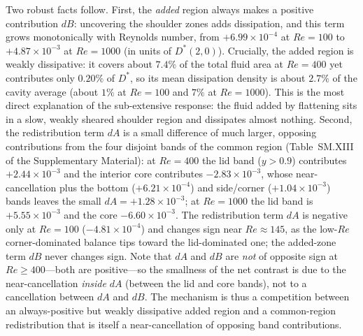 Two robust facts follow. First, the \emph{added} region always makes a positive contribution $dB$: uncovering the shoulder zones adds dissipation, and this term grows monotonically with Reynolds number, from $+6.99\times10^{-4}$ at $Re=100$ to $+4.87\times10^{-3}$ at $Re=1000$ (in units of $D^*(2,0)$). Crucially, the added region is weakly dissipative: it covers about $7.4\%$ of the total fluid area at $Re=400$ yet contributes only $0.20\%$ of $D^*$, so its mean dissipation density is about $2.7\%$ of the cavity average (about $1\%$ at $Re=100$ and $7\%$ at $Re=1000$). This is the most direct explanation of the sub-extensive response: the fluid added by flattening sits in a slow, weakly sheared shoulder region and dissipates almost nothing. Second, the redistribution term $dA$ is a small difference of much larger, opposing contributions from the four disjoint bands of the common region (Table~SM.XIII of the Supplementary Material): at $Re=400$ the lid band ($y>0.9$) contributes $+2.44\times10^{-3}$ and the interior core contributes $-2.83\times10^{-3}$, whose near-cancellation plus the bottom ($+6.21\times10^{-4}$) and side/corner ($+1.04\times10^{-3}$) bands leaves the small $dA=+1.28\times10^{-3}$; at $Re=1000$ the lid band is $+5.55\times10^{-3}$ and the core $-6.60\times10^{-3}$. The redistribution term $dA$ is negative only at $Re=100$ ($-4.81\times10^{-4}$) and changes sign near $Re\approx145$, as the low-$Re$ corner-dominated balance tips toward the lid-dominated one; the added-zone term $dB$ never changes sign. Note that $dA$ and $dB$ are \emph{not} of opposite sign at $Re\ge400$---both are positive---so the smallness of the net contrast is due to the near-cancellation \emph{inside} $dA$ (between the lid and core bands), not to a cancellation between $dA$ and $dB$. The mechanism is thus a competition between an always-positive but weakly dissipative added region and a common-region redistribution that is itself a near-cancellation of opposing band contributions.

